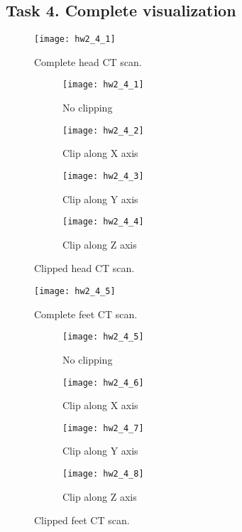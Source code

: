 \documentclass[11pt]{article}
\begin{document}
\subsection*{Task 4. Complete visualization}

\begin{figure}[H]
\centering
\texttt{[image: hw2\_4\_1]}
\caption{Complete head CT scan.}
\label{fig:hw2_4_1}
\end{figure}

\begin{figure}[H]
\begin{subfigure}{.5\textwidth}
  \centering
  \texttt{[image: hw2\_4\_1]}
  \caption{No clipping}
  \label{fig:hw2_4_1}
\end{subfigure}
\begin{subfigure}{.5\textwidth}
  \centering
  \texttt{[image: hw2\_4\_2]}
  \caption{Clip along X axis}
  \label{fig:hw2_4_2}
\end{subfigure}

\begin{subfigure}{.5\textwidth}
  \centering
  \texttt{[image: hw2\_4\_3]}
  \caption{Clip along Y axis}
  \label{fig:hw2_4_3}
\end{subfigure}
\begin{subfigure}{.5\textwidth}
  \centering
  \texttt{[image: hw2\_4\_4]}
  \caption{Clip along Z axis}
  \label{fig:hw2_4_4}
\end{subfigure}
\caption{Clipped head CT scan.}
\label{fig:hw2_4_1-4}
\end{figure}

\begin{figure}[H]
\centering
\texttt{[image: hw2\_4\_5]}
\caption{Complete feet CT scan.}
\label{fig:hw2_4_5}
\end{figure}

\begin{figure}[H]
\begin{subfigure}{.5\textwidth}
  \centering
  \texttt{[image: hw2\_4\_5]}
  \caption{No clipping}
  \label{fig:hw2_4_5}
\end{subfigure}
\begin{subfigure}{.5\textwidth}
  \centering
  \texttt{[image: hw2\_4\_6]}
  \caption{Clip along X axis}
  \label{fig:hw2_4_6}
\end{subfigure}

\begin{subfigure}{.5\textwidth}
  \centering
  \texttt{[image: hw2\_4\_7]}
  \caption{Clip along Y axis}
  \label{fig:hw2_4_7}
\end{subfigure}
\begin{subfigure}{.5\textwidth}
  \centering
  \texttt{[image: hw2\_4\_8]}
  \caption{Clip along Z axis}
  \label{fig:hw2_4_8}
\end{subfigure}
\caption{Clipped feet CT scan.}
\label{fig:hw2_4_5-8}
\end{figure}
\end{document}
